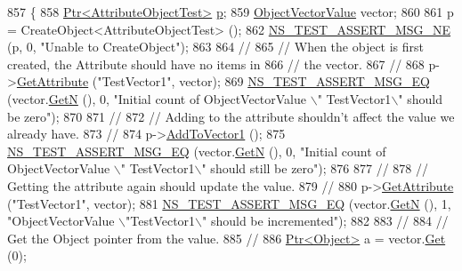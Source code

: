 \begin{DoxyCode}
857 \{
858   \hyperlink{classns3_1_1Ptr}{Ptr<AttributeObjectTest>} \hyperlink{lte__link__budget_8m_ac9de518908a968428863f829398a4e62}{p};
859   \hyperlink{classns3_1_1ObjectPtrContainerValue}{ObjectVectorValue} vector;
860 
861   p = CreateObject<AttributeObjectTest> ();
862   \hyperlink{group__testing_ga73d66fb0050a5111453fd144e767b91a}{NS\_TEST\_ASSERT\_MSG\_NE} (p, 0, \textcolor{stringliteral}{"Unable to CreateObject"});
863 
864   \textcolor{comment}{//}
865   \textcolor{comment}{// When the object is first created, the Attribute should have no items in}
866   \textcolor{comment}{// the vector.}
867   \textcolor{comment}{//}
868   p->\hyperlink{classns3_1_1ObjectBase_a895d1de2f96063d0e0fd78463e7a7e30}{GetAttribute} (\textcolor{stringliteral}{"TestVector1"}, vector);
869   \hyperlink{group__testing_ga2a9d78cffb3db8e867c35fff0b698cf5}{NS\_TEST\_ASSERT\_MSG\_EQ} (vector.\hyperlink{classns3_1_1ObjectPtrContainerValue_a0b282241030189e3f60e76e52d176710}{GetN} (), 0, \textcolor{stringliteral}{"Initial count of ObjectVectorValue \(\backslash\)"
      TestVector1\(\backslash\)" should be zero"});
870 
871   \textcolor{comment}{//}
872   \textcolor{comment}{// Adding to the attribute shouldn't affect the value we already have.}
873   \textcolor{comment}{//}
874   p->\hyperlink{classAttributeObjectTest_a932bcea4a5820c0214e339cb269d494f}{AddToVector1} ();
875   \hyperlink{group__testing_ga2a9d78cffb3db8e867c35fff0b698cf5}{NS\_TEST\_ASSERT\_MSG\_EQ} (vector.\hyperlink{classns3_1_1ObjectPtrContainerValue_a0b282241030189e3f60e76e52d176710}{GetN} (), 0, \textcolor{stringliteral}{"Initial count of ObjectVectorValue \(\backslash\)"
      TestVector1\(\backslash\)" should still be zero"});
876 
877   \textcolor{comment}{//}
878   \textcolor{comment}{// Getting the attribute again should update the value.}
879   \textcolor{comment}{//}
880   p->\hyperlink{classns3_1_1ObjectBase_a895d1de2f96063d0e0fd78463e7a7e30}{GetAttribute} (\textcolor{stringliteral}{"TestVector1"}, vector);
881   \hyperlink{group__testing_ga2a9d78cffb3db8e867c35fff0b698cf5}{NS\_TEST\_ASSERT\_MSG\_EQ} (vector.\hyperlink{classns3_1_1ObjectPtrContainerValue_a0b282241030189e3f60e76e52d176710}{GetN} (), 1, \textcolor{stringliteral}{"ObjectVectorValue \(\backslash\)"TestVector1\(\backslash\)"
       should be incremented"});
882 
883   \textcolor{comment}{//}
884   \textcolor{comment}{// Get the Object pointer from the value.}
885   \textcolor{comment}{//}
886   \hyperlink{classns3_1_1Ptr}{Ptr<Object>} a = vector.\hyperlink{classns3_1_1ObjectPtrContainerValue_ad9f4d85a7345b797cb3521d17b979b47}{Get} (0);

\end{DoxyCode}
